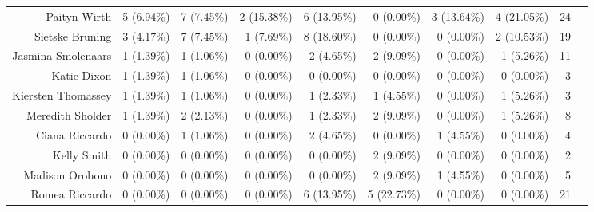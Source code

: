 \documentclass{article} %
\begin{document}
\begin{table}[ht]
{\begin{tabular}{rlrrrrrrrr}
		      Paityn Wirth & 5 (6.94\%)               &                7 (7.45\%) &               2 (15.38\%) &         6 (13.95\%) &                   0 (0.00\%) &                        3 (13.64\%) &             4 (21.05\%) &                  24 &  \\
		   Sietske Bruning & 3 (4.17\%)               &                7 (7.45\%) &                1 (7.69\%) &         8 (18.60\%) &                   0 (0.00\%) &                         0 (0.00\%) &             2 (10.53\%) &                  19 &  \\
		Jasmina Smolenaars & 1 (1.39\%)               &                1 (1.06\%) &                0 (0.00\%) &          2 (4.65\%) &                   2 (9.09\%) &                         0 (0.00\%) &              1 (5.26\%) &                  11 &  \\
		       Katie Dixon & 1 (1.39\%)               &                1 (1.06\%) &                0 (0.00\%) &          0 (0.00\%) &                   0 (0.00\%) &                         0 (0.00\%) &              0 (0.00\%) &                   3 &  \\
		Kiersten Thomassey & 1 (1.39\%)               &                1 (1.06\%) &                0 (0.00\%) &          1 (2.33\%) &                   1 (4.55\%) &                         0 (0.00\%) &              1 (5.26\%) &                   3 &  \\
		  Meredith Sholder & 1 (1.39\%)               &                2 (2.13\%) &                0 (0.00\%) &          1 (2.33\%) &                   2 (9.09\%) &                         0 (0.00\%) &              1 (5.26\%) &                   8 &  \\
		    Ciana Riccardo & 0 (0.00\%)               &                1 (1.06\%) &                0 (0.00\%) &          2 (4.65\%) &                   0 (0.00\%) &                         1 (4.55\%) &              0 (0.00\%) &                   4 &  \\
		       Kelly Smith & 0 (0.00\%)               &                0 (0.00\%) &                0 (0.00\%) &          0 (0.00\%) &                   2 (9.09\%) &                         0 (0.00\%) &              0 (0.00\%) &                   2 &  \\
		   Madison Orobono & 0 (0.00\%)               &                0 (0.00\%) &                0 (0.00\%) &          0 (0.00\%) &                   2 (9.09\%) &                         1 (4.55\%) &              0 (0.00\%) &                   5 &  \\
		    Romea Riccardo & 0 (0.00\%)               &                0 (0.00\%) &                0 (0.00\%) &         6 (13.95\%) &                  5 (22.73\%) &                         0 (0.00\%) &              0 (0.00\%) &                  21 &  \\

\end{tabular}}
\end{table}
\end{document}
